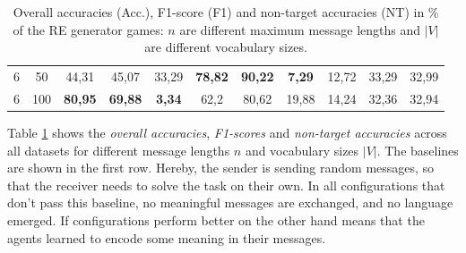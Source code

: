 \begin{table}[ht]
\begin{tabular}{cc|ccc|ccc|ccc}
        {6}                           & {50}   & {44,31}                             & {45,07}                             & {33,29}                                  & {\textbf{78,82}} & {\textbf{90,22}} & {\textbf{7,29}} & {12,72}       & {33,29}     & {32,99}     \\
        {6}                           & {100}  & {\textbf{80,95}}                    & {\textbf{69,88}}                    & {\textbf{3,34}}                          & {62,2}           & {80,62}          & {19,88}         & {14,24}       & {32,36}     & {32,94}     \\
        \bottomrule
    \end{tabular}
    \caption{Overall accuracies (Acc.), F1-score (F1) and non-target accuracies (NT) in \% of the RE generator games: $n$ are different maximum message lengths and $|V|$ are different vocabulary sizes.}
    \label{tab:results:re-generator-game}
\end{table}

Table \ref{tab:results:re-generator-game} shows the \emph{overall accuracies}, \emph{F1-scores} and \emph{non-target accuracies} across all datasets for different message lengths $n$ and vocabulary sizes $|V|$.
The baselines are shown in the first row.
Hereby, the sender is sending random messages, so that the receiver needs to solve the task on their own.
In all configurations that don't pass this baseline, no meaningful messages are exchanged, and no language emerged.
If configurations perform better on the other hand means that the agents learned to encode some meaning in their messages.

